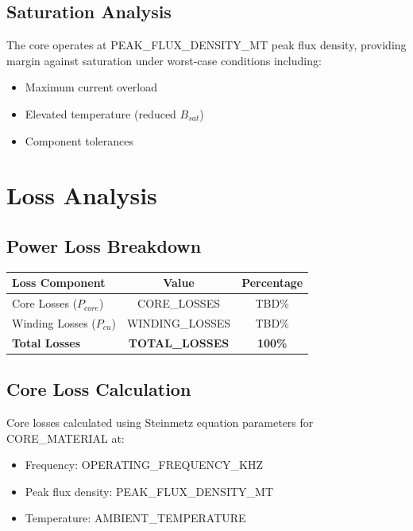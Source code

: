 \documentclass[11pt,a4paper]{article}
\begin{document}
\subsection{Saturation Analysis}
The core operates at {{PEAK_FLUX_DENSITY_MT}} peak flux density, providing margin against saturation under worst-case conditions including:
\begin{itemize}
    \item Maximum current overload
    \item Elevated temperature (reduced $B_{sat}$)
    \item Component tolerances
\end{itemize}

\section{Loss Analysis}

\subsection{Power Loss Breakdown}
\begin{longtable}{|l|c|c|}
\hline
\textbf{Loss Component} & \textbf{Value} & \textbf{Percentage} \\
\hline
Core Losses ($P_{core}$) & {{CORE_LOSSES}} & TBD\% \\
\hline
Winding Losses ($P_{cu}$) & {{WINDING_LOSSES}} & TBD\% \\
\hline
\textbf{Total Losses} & \textbf{{{TOTAL_LOSSES}}} & \textbf{100\%} \\
\hline
\end{longtable}

\subsection{Core Loss Calculation}
Core losses calculated using Steinmetz equation parameters for {{CORE_MATERIAL}} at:
\begin{itemize}
    \item Frequency: {{OPERATING_FREQUENCY_KHZ}}
    \item Peak flux density: {{PEAK_FLUX_DENSITY_MT}}
    \item Temperature: {{AMBIENT_TEMPERATURE}}
\end{itemize}
\end{document}

